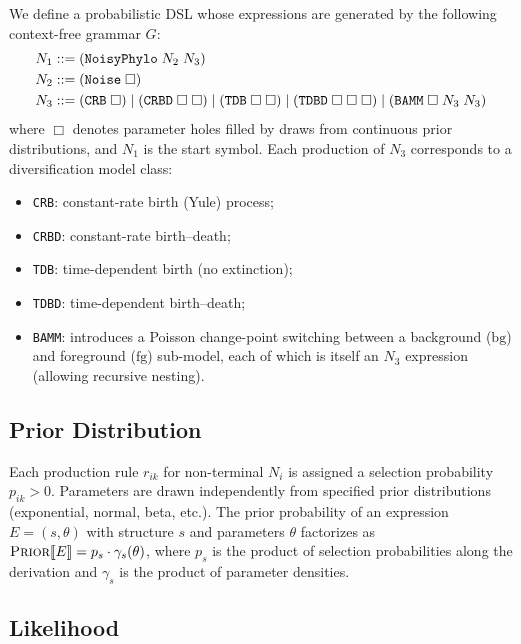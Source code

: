 \documentclass[11pt,a4paper]{article}
\newcommand{\Prior}{\textsc{Prior}}
\newcommand{\sem}[1]{\llbracket #1 \rrbracket}
\begin{document}
We define a probabilistic DSL whose expressions are generated by the
following context-free grammar $G$:
\begin{align}
  N_1 &::= (\texttt{NoisyPhylo}\; N_2\; N_3) \notag\\
  N_2 &::= (\texttt{Noise}\; \Box) \notag\\
  N_3 &::= (\texttt{CRB}\; \Box)
       \mid (\texttt{CRBD}\; \Box\; \Box)
       \mid (\texttt{TDB}\; \Box\; \Box)
       \mid (\texttt{TDBD}\; \Box\; \Box\; \Box)
       \mid (\texttt{BAMM}\; \Box\; N_3\; N_3)
  \label{eq:grammar}
\end{align}
where $\Box$ denotes parameter holes filled by draws from continuous
prior distributions, and $N_1$ is the start symbol.  Each production of
$N_3$ corresponds to a diversification model class:
\begin{itemize}[nosep]
  \item \texttt{CRB}: constant-rate birth (Yule) process;
  \item \texttt{CRBD}: constant-rate birth--death;
  \item \texttt{TDB}: time-dependent birth (no extinction);
  \item \texttt{TDBD}: time-dependent birth--death;
  \item \texttt{BAMM}: introduces a Poisson change-point switching between a
    background ($\text{bg}$) and foreground ($\text{fg}$) sub-model,
    each of which is itself an $N_3$ expression (allowing recursive
    nesting).
\end{itemize}

\subsection{Prior Distribution}

Each production rule $r_{ik}$ for non-terminal $N_i$ is assigned a
selection probability $p_{ik} > 0$.  Parameters are drawn independently
from specified prior distributions (exponential, normal, beta, etc.).
The prior probability of an expression $E = (s, \theta)$ with structure
$s$ and parameters $\theta$ factorizes as
$\Prior\sem{E} = p_s \cdot \gamma_s(\theta)$, where $p_s$ is the
product of selection probabilities along the derivation and $\gamma_s$
is the product of parameter densities.

\subsection{Likelihood}
\end{document}
